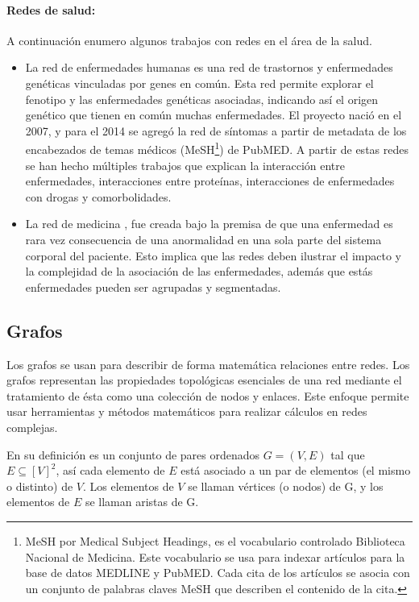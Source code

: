 \paragraph{Redes de salud:} A continuación enumero algunos trabajos con redes en el área de la salud.
\begin{itemize}
\item La red de enfermedades humanas \cite{Goh2007TheNetwork.} es una red de trastornos y enfermedades genéticas vinculadas por genes en común. Esta red permite explorar el fenotipo y las enfermedades genéticas asociadas, indicando así el origen genético que tienen en común muchas enfermedades. El proyecto nació en el 2007, y para el 2014 se agregó la red de síntomas a partir de metadata de los encabezados de temas médicos (MeSH\footnote{MeSH por Medical Subject Headings, es el vocabulario controlado Biblioteca Nacional de Medicina. Este vocabulario se usa para indexar artículos para la base de datos MEDLINE y PubMED. Cada cita de los artículos se asocia con un conjunto de palabras claves MeSH que describen el contenido de la cita.}) de PubMED. A partir de estas redes se han hecho múltiples trabajos que explican la interacción entre enfermedades, interacciones entre proteínas, interacciones de enfermedades con drogas y comorbolidades.
\item La red de medicina \cite{Haaren2013,Barabasi2011NetworkDisease}, fue creada  bajo la premisa de que una enfermedad es rara vez consecuencia de una anormalidad en una sola parte del sistema corporal del paciente. Esto implica que las redes deben ilustrar el impacto y la complejidad de la asociación de las enfermedades, además que estás enfermedades pueden ser agrupadas y segmentadas.
\end{itemize}

\subsection{Grafos}
Los grafos se usan para describir de forma matemática relaciones entre redes. Los grafos representan las propiedades topológicas esenciales de una red mediante el tratamiento de ésta como una colección de nodos y enlaces. Este enfoque permite usar herramientas y métodos matemáticos para realizar cálculos en redes complejas.

En su definición es un conjunto de pares ordenados $G=(V,E)$ tal que $E\subseteq [V]^{2}$, así cada elemento de $E$ está asociado a un par de elementos (el mismo o distinto) de $V$. Los elementos de $V$ se llaman vértices (o nodos) de G, y los elementos de $E$ se llaman aristas de G.\cite{Diestel2005GraphTheory,Balakrishnan2000ATheory} 


